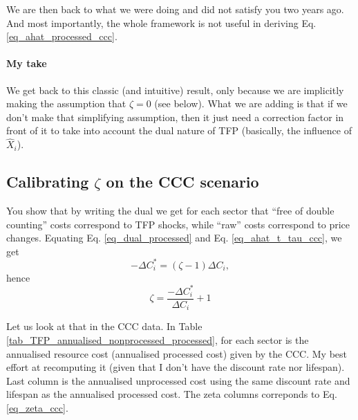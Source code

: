 \documentclass[11pt]{article}
\begin{document}
We are then back to what we were doing and did not satisfy you two years ago. And most importantly, the whole framework is not useful in deriving Eq. \eqref{eq_ahat_processed_ccc}. 

\paragraph{My take} We get back to this classic (and intuitive) result, only because we are implicitly making the assumption that $\zeta=0$ (see below). What we are adding is that if we don't make that simplifying assumption, then it just need a correction factor in front of it to take into account the dual nature of TFP (basically, the influence of $\hat{X}_i$).



\subsection{Calibrating $\zeta$ on the CCC scenario}

You show that by writing the dual we get for each sector that ``free of double counting'' costs correspond to TFP shocks, while ``raw'' costs correspond to price changes. Equating Eq. \eqref{eq_dual_processed} and Eq. \eqref{eq_ahat_t_tau_ccc}, we get
\begin{equation*}
    -\Delta C^*_i=(\zeta-1)\Delta C_i,
\end{equation*} 
hence 
\begin{equation}
\label{eq_zeta_ccc}
     \zeta=\frac{-\Delta C^*_i}{\Delta C_i}+1
\end{equation}

Let us look at that in the CCC data. In Table \ref{tab_TFP_annualised_nonprocessed_processed}, for each sector is the annualised resource cost (annualised processed cost) given by the CCC. My best effort at recomputing it (given that I don't have the discount rate nor lifespan). Last column is the annualised unprocessed cost using the same discount rate and lifespan as the annualised processed cost. The zeta columns correponds to Eq. \eqref{eq_zeta_ccc}.
\end{document}

